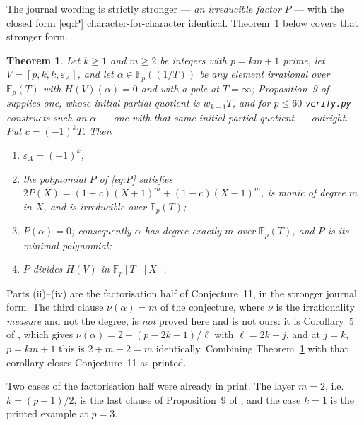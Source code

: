 \documentclass[11pt]{amsart}
\newtheorem{theorem}{Theorem}
\theoremstyle{remark}
\newcommand{\Fp}{\mathbb F_p}
\newcommand{\HV}{H(V)}
\begin{document}
\noindent
The journal wording is strictly stronger --- \emph{an irreducible factor} $P$ --- with the closed
form \eqref{eq:P} character-for-character identical. Theorem~\ref{thm:main} below covers that
stronger form.

\begin{theorem}\label{thm:main}
Let $k\ge1$ and $m\ge2$ be integers with $p=km+1$ prime, let $V=[p,k,k,\varepsilon_A]$, and let
$\alpha\in\Fp((1/T))$ be \emph{any} element irrational over $\Fp(T)$ with $\HV(\alpha)=0$ and with a
pole at $T=\infty$; Proposition~9 of \textup{\cite{L}} supplies one, whose initial partial quotient
is $w_{k+1}T$, and for $p\le60$ \texttt{verify.py} constructs such an $\alpha$ --- one with that same
initial partial quotient --- outright. Put
$c=(-1)^kT$. Then
\begin{enumerate}
\item[\textup{(i)}] $\varepsilon_A=(-1)^k$;
\item[\textup{(ii)}] the polynomial $P$ of \eqref{eq:P} satisfies
      $2P(X)=(1+c)(X+1)^m+(1-c)(X-1)^m$, is monic of degree $m$ in $X$, and is irreducible over
      $\Fp(T)$;
\item[\textup{(iii)}] $P(\alpha)=0$; consequently $\alpha$ has degree exactly $m$ over $\Fp(T)$,
      and $P$ is its minimal polynomial;
\item[\textup{(iv)}] $P$ divides $\HV$ in $\Fp[T][X]$.
\end{enumerate}
\end{theorem}

Parts (ii)--(iv) are the factorisation half of Conjecture~11, in the stronger journal form. The
third clause $\nu(\alpha)=m$ of the conjecture, where $\nu$ is the irrationality \emph{measure} and
not the degree, is \emph{not} proved here and is not ours: it is Corollary~5 of \cite{L}, which
gives $\nu(\alpha)=2+(p-2k-1)/\ell$ with $\ell=2k-j$, and at $j=k$, $p=km+1$ this is $2+m-2=m$
identically. Combining Theorem~\ref{thm:main} with that corollary closes Conjecture~11 as printed.

Two cases of the factorisation half were already in print. The layer $m=2$, i.e.\ $k=(p-1)/2$, is
the last clause of Proposition~9 of \cite{L}, and the case $k=1$ is the printed example at $p=3$.
\end{document}
